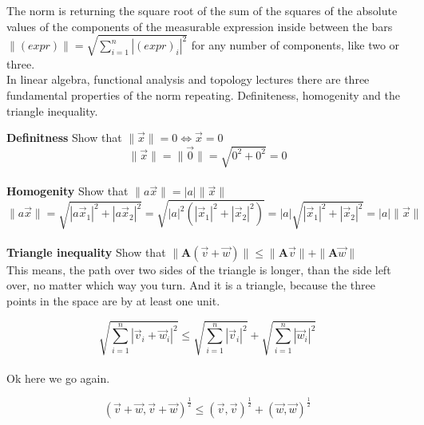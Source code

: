 \documentclass[a4paper]{article}
\begin{document}
 The norm is returning  the square root of the sum of the squares of the absolute values of the components of the measurable expression inside between the bars $\|(expr)\| = \sqrt{\sum_{i=1}^{n}|(expr)_{i}|^2}$ for any number of components, like two or three.\\

In linear algebra, functional analysis and topology lectures there are three fundamental properties of the norm repeating. Definiteness, homogenity and the triangle inequality. 

\textbf{Definitness} Show that $\|\vec{x}\| = 0 \iff \vec{x} = 0$\\

\begin{displaymath}
    \|\vec{x}\| = \|\vec{0}\| = \sqrt{0^{2} + 0^{2}} = 0
\end{displaymath}\\

\textbf{Homogenity} Show that $\|a\vec{x}\| = |a|\|\vec{x}\|$\\

\begin{displaymath}
    \|a\vec{x}\| = \sqrt{|a\vec{x}_1|^{2} + |a\vec{x}_2|^{2}} = \sqrt{|a|^{2}(|\vec{x}_1|^{2} + |\vec{x}_2|^{2})} = |a|\sqrt{|\vec{x}_1|^{2} + |\vec{x}_2|^{2}} = |a|\|\vec{x}\|
\end{displaymath}\\

\textbf{Triangle inequality} Show that $ \|\boldsymbol{A}(\vec{v} + \vec{w})\| \leq \|\boldsymbol{A}\vec{v}\| + \|\boldsymbol{A}\vec{w}\|$\\

This means, the path over two sides of the triangle is longer, than the side left over, no matter which way you turn. And it is a triangle, because the three points in the space are by at least one unit.

\begin{displaymath}
    \sqrt{\sum_{i=1}^{n}|\vec{v}_{i} + \vec{w}_{i}|^{2}} \leq \sqrt{\sum_{i=1}^{n}|\vec{v}_{i}|^{2}} + \sqrt{\sum_{i=1}^{n}|\vec{w}_{i}|^{2}} 
\end{displaymath}\\

Ok here we go again.

\begin{displaymath}
(\vec{v}+\vec{w}, \vec{v}+\vec{w})^{\frac{1}{2}} \leq (\vec{v},\vec{v})^{\frac{1}{2}}+(\vec{w},\vec{w})^{\frac{1}{2}}
\end{displaymath}
\end{document}
